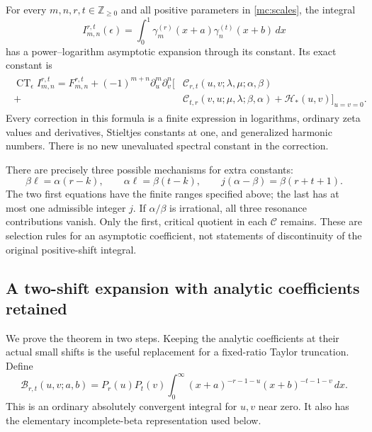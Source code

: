 \begin{theorem}\label{mc:main}
For every $m,n,r,t\in\mathbb Z_{\ge0}$ and all positive parameters
in \eqref{mc:scales}, the integral
\[
 I_{m,n}^{r,t}(\epsilon)
   =\int_0^1\gamma_m^{(r)}(x+a)
                   \gamma_n^{(t)}(x+b)\,dx
\]
has a power--logarithm asymptotic expansion through its constant.
Its exact constant is
\begin{align}\label{mc:main-constant}
 \boxed{\begin{aligned}
 \operatorname{CT}_{\epsilon}I_{m,n}^{r,t}
  =F_{m,n}^{r,t}+(-1)^{m+n}\partial_u^m\partial_v^n
    \big[&\mathcal C_{r,t}(u,v;\lambda,\mu;\alpha,\beta)\\
       +&\mathcal C_{t,r}(v,u;\mu,\lambda;\beta,\alpha)
         +\mathcal H_*(u,v)\big]_{u=v=0}.
 \end{aligned}}
\end{align}
Every correction in this formula is a finite expression in
logarithms, ordinary zeta values and derivatives, Stieltjes constants
at one, and generalized harmonic numbers. There is no new
unevaluated spectral constant in the correction.
\end{theorem}

There are precisely three possible mechanisms for extra constants:
\begin{equation}\label{mc:three-mechanisms}
 \beta\ell=\alpha(r-k),\qquad
 \alpha\ell=\beta(t-k),\qquad
 j(\alpha-\beta)=\beta(r+t+1).
\end{equation}
The two first equations have the finite ranges specified above;
the last has at most one admissible integer $j$. If $\alpha/\beta$
is irrational, all three resonance contributions vanish. Only the
first, critical quotient in each $\mathcal C$ remains. These are
selection rules for an asymptotic coefficient, not statements of
discontinuity of the original positive-shift integral.

\subsection{A two-shift expansion with analytic coefficients retained}

We prove the theorem in two steps. Keeping the analytic coefficients
at their actual small shifts is the useful replacement for a
fixed-ratio Taylor truncation. Define
\begin{equation}\label{mc:kernel}
 \mathcal B_{r,t}(u,v;a,b)
  =P_r(u)P_t(v)\int_0^\infty
             (x+a)^{-r-1-u}(x+b)^{-t-1-v}\,dx.
\end{equation}
This is an ordinary absolutely convergent integral for $u,v$ near
zero. It also has the elementary incomplete-beta representation
used below.

